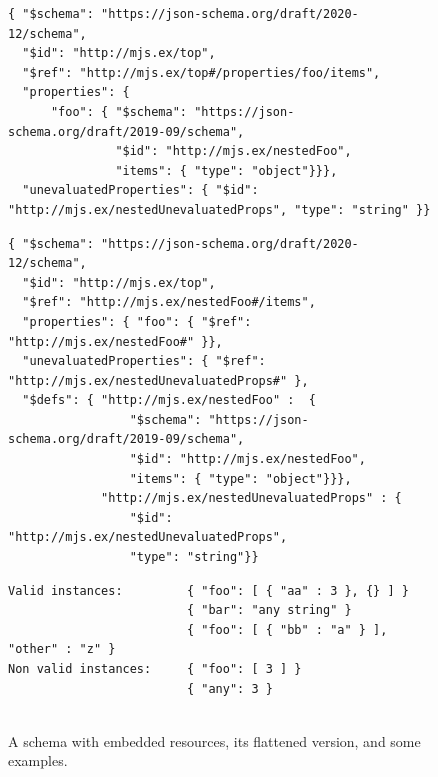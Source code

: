 \begin{figure}[htb!]
\begin{querybox}{}
\begin{lstlisting}[style=query,escapechar=Z]
{ "$schema": "https://json-schema.org/draft/2020-12/schema",
  "$id": "http://mjs.ex/top",
  "$ref": "http://mjs.ex/top#/properties/foo/items",
  "properties": {
      "foo": { "$schema": "https://json-schema.org/draft/2019-09/schema",
               "$id": "http://mjs.ex/nestedFoo",
               "items": { "type": "object"}}},
  "unevaluatedProperties": { "$id": "http://mjs.ex/nestedUnevaluatedProps", "type": "string" }}
\end{lstlisting}
\end{querybox}

\begin{querybox}{}
\begin{lstlisting}[style=query,escapechar=Z]
{ "$schema": "https://json-schema.org/draft/2020-12/schema",
  "$id": "http://mjs.ex/top",
  "$ref": "http://mjs.ex/nestedFoo#/items",
  "properties": { "foo": { "$ref": "http://mjs.ex/nestedFoo#" }},
  "unevaluatedProperties": { "$ref": "http://mjs.ex/nestedUnevaluatedProps#" },
  "$defs": { "http://mjs.ex/nestedFoo" :  {
                 "$schema": "https://json-schema.org/draft/2019-09/schema",
                 "$id": "http://mjs.ex/nestedFoo",
                 "items": { "type": "object"}}},
             "http://mjs.ex/nestedUnevaluatedProps" : {
                 "$id": "http://mjs.ex/nestedUnevaluatedProps",
                 "type": "string"}}
\end{lstlisting}
\end{querybox}

\begin{querybox}{}
\begin{lstlisting}[style=query,escapechar=Z]
Valid instances:         { "foo": [ { "aa" : 3 }, {} ] }
                         { "bar": "any string" }
                         { "foo": [ { "bb" : "a" } ], "other" : "z" }
Non valid instances:     { "foo": [ 3 ] }
                         { "any": 3 }


\end{lstlisting}
\end{querybox}
\caption{A schema with embedded resources, its flattened version, and some examples.}\label{fig:embedded}
\end{figure}



